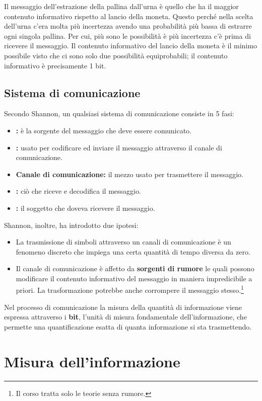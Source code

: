 \documentclass{article}
\theoremstyle{definition}
\numberwithin{equation}{section}
\begin{document}
Il messaggio dell'estrazione della pallina dall'urna è quello che ha il maggior contenuto informativo rispetto al lancio della moneta. Questo perché nella scelta dell'urna c'era molta più incertezza avendo una probabilità più bassa di estrarre ogni singola pallina. Per cui, più sono le possibilità è più incertezza c'è prima di ricevere il messaggio. Il contenuto informativo del lancio della moneta è il minimo possibile visto che ci sono solo due possibilità equiprobabili; il contenuto informativo è precisamente 1 bit.

\subsection{Sistema di comunicazione}
Secondo Shannon, un qualsiasi sistema di comunicazione consiste in 5 fasi:
\begin{itemize}
    \item \textbf{:} è la sorgente del messaggio che deve essere comunicato.
    \item \textbf{:} usato per codificare ed inviare il messaggio attraverso il canale di comunicazione.
    \item \textbf{Canale di comunicazione:} il mezzo usato per trasmettere il messaggio.
    \item \textbf{:} ciò che riceve e decodifica il messaggio.
    \item \textbf{:} il soggetto che doveva ricevere il messaggio.
\end{itemize}
Shannon, inoltre, ha introdotto due ipotesi:
\begin{itemize}
    \item La trasmissione di simboli attraverso un canali di comunicazione è un fenomeno discreto che impiega una certa quantità di tempo diversa da zero.
    \item Il canale di comunicazione è affetto da \textbf{sorgenti di rumore} le quali possono modificare il contenuto informativo del messaggio in maniera impredicibile a priori. La trasformazione potrebbe anche corrompere il messaggio stesso.\footnote{Il corso tratta solo le teorie senza rumore.}
\end{itemize}
Nel processo di comunicazione la misura della quantità di informazione viene espressa attraverso i \textbf{bit}, l'unità di misura fondamentale dell'informazione, che permette una quantificazione esatta di quanta informazione si sta trasmettendo.

\section{Misura dell'informazione}
\end{document}
